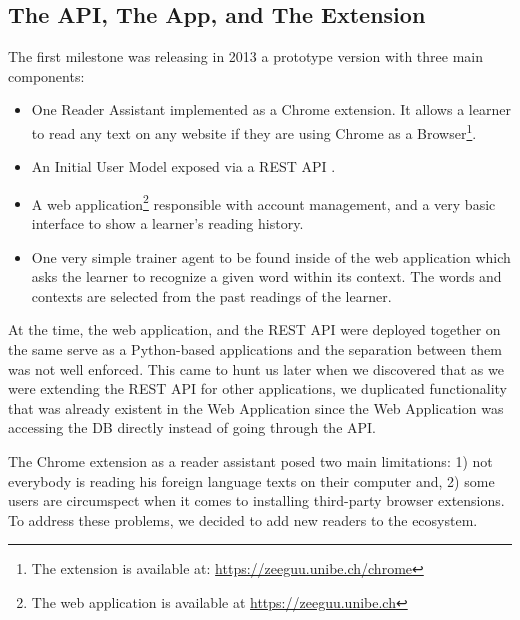 \documentclass{sig-alternate-05-2015}
\begin{document}
\subsection {The API, The App, and The Extension}
The first milestone was releasing in 2013 a prototype version with three main components: 

\begin{itemize}
	\item One Reader Assistant implemented as a Chrome extension. It allows a learner to read any text on any website if they are using Chrome as a Browser\footnote{The extension is available at: \url{https://zeeguu.unibe.ch/chrome}}. 

	\item An Initial User Model exposed via a REST API  \cite{Lung16zeeguu}. 

	\item A web application\footnote{The web application is available at \url{https://zeeguu.unibe.ch}} responsible with account management, and a very basic interface to show a learner's reading history. 

	\item One very simple trainer agent to be found inside of the web application which asks the learner to recognize a given word within its context. The words and contexts are selected from the past readings of the learner.

\end{itemize}

At the time, the web application, and the REST API were deployed together on the same serve as a Python-based applications and the separation between them was not well enforced. This came to hunt us later when we discovered that as we were extending the REST API for other applications, we duplicated functionality that was already existent in the Web Application since the Web Application was accessing the DB directly instead of going through the API.



The Chrome extension as a reader assistant posed two main limitations: 
	1) not everybody is reading his foreign language texts on their computer and,
	2) some users are circumspect when it comes to installing third-party browser extensions.
To address these problems, we decided to add new readers to the ecosystem.
\end{document}

